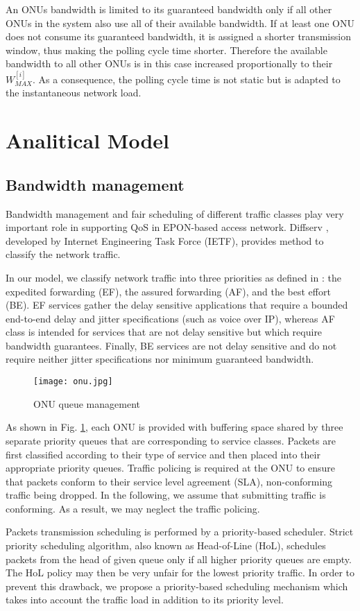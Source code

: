 \documentclass[a4paper,10pt]{IEEEtran}
\begin{document}
An ONUs bandwidth is limited to its guaranteed bandwidth only if all
other ONUs in the system also use all of their available bandwidth.
If at least one ONU does not consume its guaranteed bandwidth, it is
assigned a shorter transmission window, thus making the polling
cycle time shorter. Therefore the available bandwidth to all other
ONUs is in this case increased proportionally to their
$W_{MAX}^{[i]}$. As a consequence, the polling cycle time is not
static but is adapted to the instantaneous network load.
\section{Analitical Model}
\subsection{Bandwidth management}
Bandwidth management and fair scheduling of different traffic
classes play very important role in supporting QoS in EPON-based
access network. Diffserv \cite{Diffserv:1998}, developed by Internet
Engineering Task Force (IETF), provides method to classify the
network traffic.

In our model, we classify network traffic into three priorities as
defined in \cite{Diffserv:1998}: the expedited forwarding (EF), the
assured forwarding (AF), and the best effort (BE). EF services
gather the delay sensitive applications that require a bounded
end-to-end delay and jitter specifications (such as voice over IP),
whereas AF class is intended for services that are not delay
sensitive but which require bandwidth guarantees. Finally, BE
services are not delay sensitive and do not require neither jitter
specifications nor minimum guaranteed bandwidth.
\begin{figure}[!h]
\centering
\texttt{[image: onu.jpg]}
\caption{ONU queue management} \label{onu-management}
\end{figure}
As shown in Fig. \ref{onu-management}, each ONU is provided with
buffering space shared by three separate priority queues that are
corresponding to service classes. Packets are first classified
according to their type of service and then placed into their
appropriate priority queues. Traffic policing is required at the ONU
to ensure that packets conform to their service level agreement
(SLA), non-conforming traffic being dropped. In the following, we
assume that submitting traffic is conforming. As a result, we may
neglect the traffic policing.

Packets transmission scheduling is performed by a priority-based
scheduler. Strict priority scheduling algorithm, also known as
Head-of-Line (HoL), schedules packets from the head of given queue
only if all higher priority queues are empty. The HoL policy may
then be very unfair for the lowest priority traffic. In order to
prevent this drawback, we propose a priority-based scheduling
mechanism which takes into account the traffic load in addition to
its priority level.
\end{document}
